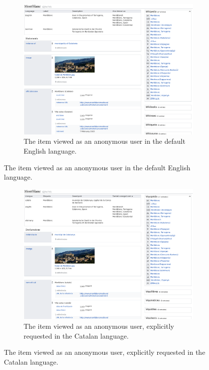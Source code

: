 \begin{figure}
  \caption{Two screenshots of the same \gls{item} viewed in different languages.}
  \label{fig:montblanc}
  \begin{subfigure}{\textwidth}
    \caption{The \gls{item} viewed as an anonymous user in the default English language.}
    \label{fig:montblanc-en}
    \includegraphics[width=\textwidth]{screenshots/montblanc-en}
  \end{subfigure}
\end{figure}
\begin{figure}\ContinuedFloat
  \begin{subfigure}{\textwidth}
    \caption{The \gls{item} viewed as an anonymous user, explicitly requested in the Catalan language.}
    \label{fig:montblanc-ca}
    \includegraphics[width=\textwidth]{screenshots/montblanc-ca}
  \end{subfigure}
\end{figure}

